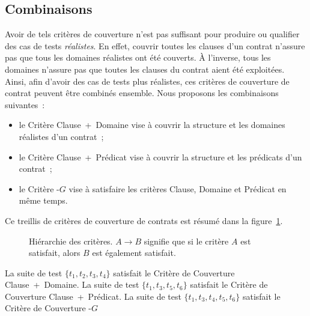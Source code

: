 \subsection{Combinaisons}
\label{subsection:test:combination}

Avoir de tels critères de couverture n'est pas suffisant pour produire ou
qualifier des cas de tests {\em réalistes}. En effet, couvrir toutes les clauses
d'un contrat n'assure pas que tous les domaines réalistes ont été couverts. À
l'inverse, tous les domaines n'assure pas que toutes les clauses du contrat
aient été exploitées. Ainsi, afin d'avoir des cas de tests plus réalistes, ces
critères de couverture de contrat peuvent être combinés ensemble. Nous proposons
les combinaisons suivantes~:
%
\begin{itemize}

\item le Critère Clause~+~Domaine vise à couvrir la structure et les domaines
réalistes d'un contrat~;

\item le Critère Clause~+~Prédicat vise à couvrir la structure et les prédicats
d'un contrat~;

\item le Critère -$G$ vise à satisfaire les critères Clause,
Domaine et Prédicat en même temps.

\end{itemize}
%
Ce {\strong treillis} de critères de couverture de contrats est résumé dans la
figure~\ref{figure:test:lattice}.

\begin{figure}


\caption[Hiérarchie des critères.]{\label{figure:test:lattice} Hiérarchie des
critères. $A \rightarrow B$ signifie que si le critère $A$ est satisfait, alors
$B$ est également satisfait.}

\end{figure}

\begin{example}

La suite de test $\{t_1, t_2, t_3, t_4\}$ satisfait le Critère de Couverture
Clause~+~Domaine. La suite de test $\{t_1, t_3, t_5, t_6\}$ satisfait le Critère
de Couverture Clause~+~Prédicat. La suite de test $\{t_1, t_3, t_4, t_5, t_6\}$
satisfait le Critère de Couverture -$G$

\end{example}
